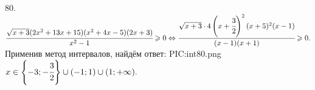 80. $\cfrac{\sqrt{x+3}(2x^2+13x+15)(x^2+4x-5)(2x+3)}{x^2-1}\geqslant0 \Leftrightarrow \cfrac{\sqrt{x+3}\cdot4\left(x+\cfrac{3}{2}\right)^2(x+5)^2(x-1)}{(x-1)(x+1)}\geqslant0.$ Применив метод интервалов, найдём ответ:
{{PIC:int80.png}}
$x\in\left\{-3;-\cfrac{3}{2}\right\}\cup(-1;1)\cup(1;+\infty).$\\
